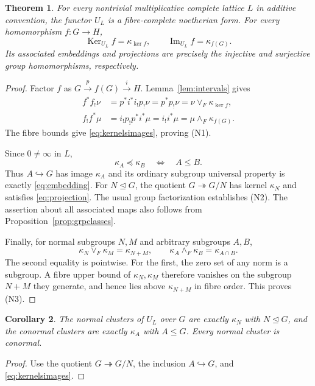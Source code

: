 \documentclass[12pt,a4paper]{amsart}
\newtheorem{theorem}{Theorem}[section]
\newtheorem{corollary}[theorem]{Corollary}
\theoremstyle{definition}
\newcommand{\im}{\operatorname{Im}}
\newcommand{\Ker}{\operatorname{Ker}}
\begin{document}
\begin{theorem}\label{thm:nf}
For every nontrivial multiplicative complete lattice $L$ in additive convention, the functor $U_L$ is a fibre-complete noetherian form. For every homomorphism $f:G\to H$,
\begin{equation}\label{eq:kernelsimages}
                  \Ker_{U_L}f=\kappa_{\ker f},\qquad
                  \im_{U_L}f=\kappa_{f(G)}.
\end{equation}
Its associated embeddings and projections are precisely the injective and surjective group homomorphisms, respectively.
\end{theorem}
\begin{proof}
Factor $f$ as $G\xrightarrow{p}f(G)\xrightarrow{i}H$.
Lemma~\ref{lem:intervals} gives
\[
 \begin{aligned}
 f^*f_!\nu&=p^*i^*i_!p_!\nu
            =p^*p_!\nu=\nu\vee_F\kappa_{\ker f},\\
 f_!f^*\mu&=i_!p_!p^*i^*\mu
            =i_!i^*\mu=\mu\wedge_F\kappa_{f(G)}.
 \end{aligned}
\]
The fibre bounds give \eqref{eq:kernelsimages}, proving \textup{(N1)}.

Since $0\ne\infty$ in $L$,
\begin{equation}\label{eq:reflectsubgroups}
                         \kappa_A\preceq\kappa_B
                         \quad\Longleftrightarrow\quad A\leq B.
\end{equation}
Thus $A\hookrightarrow G$ has image $\kappa_A$ and its ordinary subgroup universal property is exactly \eqref{eq:embedding}. For $N\trianglelefteq G$, the quotient $G\twoheadrightarrow G/N$ has kernel $\kappa_N$ and satisfies \eqref{eq:projection}. The usual group factorization establishes \textup{(N2)}. The assertion about all associated maps also follows from Proposition~\ref{prop:grpclasses}.

Finally, for normal subgroups $N,M$ and arbitrary subgroups $A,B$,
\begin{equation}\label{eq:normaloperations}
 \kappa_N\vee_F\kappa_M=\kappa_{N+M},\qquad
 \kappa_A\wedge_F\kappa_B=\kappa_{A\cap B}.
\end{equation}
The second equality is pointwise. For the first, the zero set of any norm is a subgroup. A fibre upper bound of $\kappa_N,\kappa_M$ therefore vanishes on the subgroup $N+M$ they generate, and hence lies above $\kappa_{N+M}$ in fibre order. This proves \textup{(N3)}.
\end{proof}

\begin{corollary}\label{cor:normalconormal}
The normal clusters of $U_L$ over $G$ are exactly $\kappa_N$ with $N\trianglelefteq G$, and the conormal clusters are exactly $\kappa_A$ with $A\leq G$. Every normal cluster is conormal.
\end{corollary}
\begin{proof}
Use the quotient $G\twoheadrightarrow G/N$, the inclusion $A\hookrightarrow G$, and \eqref{eq:kernelsimages}.
\end{proof}
\end{document}
